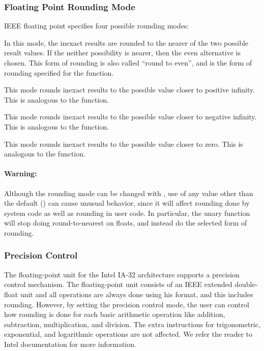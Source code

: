 \subsubsection{Floating Point Rounding Mode}
\label{float-rounding-modes}

IEEE floating point specifies four possible rounding modes:
\begin{Lentry}
  
\item[\kwd{nearest}] In this mode, the inexact results are rounded to
  the nearer of the two possible result values.  If the neither
  possibility is nearer, then the even alternative is chosen.  This
  form of rounding is also called ``round to even'', and is the form
  of rounding specified for the \clisp{}  function.
  
\item[\kwd{positive-infinity}] This mode rounds inexact results to the
  possible value closer to positive infinity.  This is analogous to
  the \clisp{}  function.
  
\item[\kwd{negative-infinity}] This mode rounds inexact results to the
  possible value closer to negative infinity.  This is analogous to
  the \clisp{}  function.
  
\item[\kwd{zero}] This mode rounds inexact results to the possible
  value closer to zero.  This is analogous to the \clisp{}
   function.
\end{Lentry}

\paragraph{Warning:}

Although the rounding mode can be changed with
, use of any value other than the
default () can cause unusual behavior, since it will
affect rounding done by \llisp{} system code as well as rounding in
user code.  In particular, the unary  function will stop
doing round-to-nearest on floats, and instead do the selected form of
rounding.

\subsubsection{Precision Control}
\label{precision-control}

The floating-point unit for the Intel IA-32 architecture supports a
precision control mechanism.  The floating-point unit consists of an
IEEE extended double-float unit and all operations are always done
using his format, and this includes rounding.  However, by setting the
precision control mode, the user can control how rounding is done for
each basic arithmetic operation like addition, subtraction,
multiplication, and division.  The extra instructions for
trigonometric, exponential, and logarithmic operations are not
affected.  We refer the reader to Intel documentation for more
information. 


